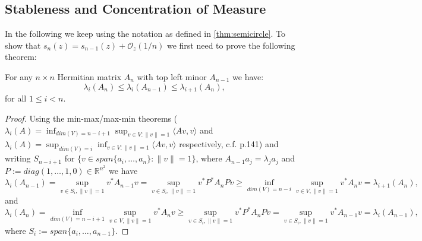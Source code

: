 \subsection{Stableness and Concentration of Measure}
In the following we keep using the notation as defined in \ref{thm:semicircle}. To show that $s_n(z)=s_{n-1}(z)+\mathcal O_z(1/n)$ we first need to prove the following theorem:

\begin{theorem}
	For any $n\times n$ Hermitian matrix $A_n$ with top left minor $A_{n-1}$ we have:
	\begin{equation*}
		\lambda_i(A_n)\leq\lambda_i(A_{n-1})\leq\lambda_{i+1}(A_n), 
	\end{equation*}
	for all $1\leq i < n$.
\end{theorem}
\begin{proof}
Using the min-max/max-min theorems ($\lambda_i(A)=\inf_{dim(V)=n-i+1}\sup_{v\in V : \|v\|=1}\langle Av,v\rangle$ and $\lambda_i(A)=\sup_{dim(V)=i}\inf_{v\in V : \|v\|=1}\langle Av,v\rangle$ respectively, c.f. \cite{TeschlQM} p.141) and writing $S_{n-i+1}$ for $\{v\in span\{a_i,\dots,a_n\}: \|v\|=1\}$, where $A_{n-1}a_j=\lambda_j a_j$ and $P:=diag(1,\dots,1,0)\in\mathbb R^{n^2}$ we have
	\begin{equation*}
		\lambda_i(A_{n-1}) =
		\sup_{v\in S_i,\|v\|=1}v^*A_{n-1}v =
		\sup_{v\in S_i,\|v\|=1}v^*P^*A_nPv \geq
		\inf_{dim(V)=n-i}\sup_{v\in V,\|v\|=1}v^*A_nv =
		\lambda_{i+1}(A_n),
	\end{equation*}
	and
	\begin{equation*}
		\lambda_i(A_n) =
		\inf_{dim(V)=n-i+1}\sup_{v\in V,\|v\|=1}v^*A_nv \geq
		\sup_{v\in S_i,\|v\|=1}v^*P^*A_nPv =
		\sup_{v\in S_i,\|v\|=1}v^*A_{n-1}v =
		\lambda_i(A_{n-1}),
	\end{equation*}
	where $S_i:=span\{a_i,\dots,a_{n-1}\}$.
\end{proof}











